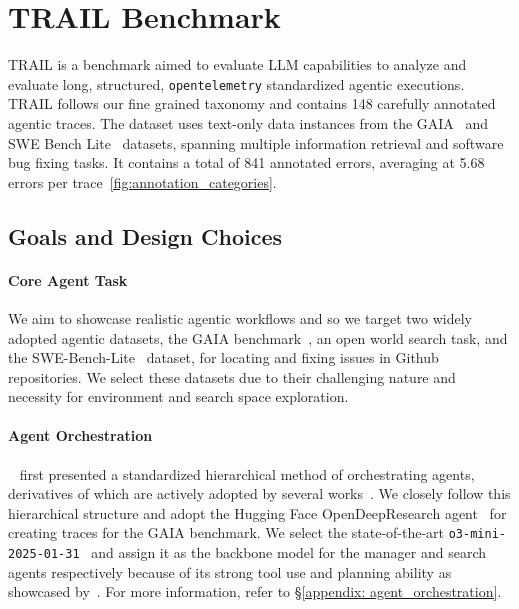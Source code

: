 \documentclass[11pt]{article}
\begin{document}
\section{TRAIL Benchmark}
\textsc{TRAIL} is a benchmark aimed to evaluate LLM capabilities to analyze and evaluate long, structured, \texttt{opentelemetry} standardized agentic executions. 
\textsc{TRAIL} follows our fine grained taxonomy and contains 148 carefully annotated agentic traces. The dataset uses text-only data instances from the GAIA~\cite{mialon2023gaia} and SWE Bench Lite~\cite{jimenez2024swebench} datasets, spanning multiple information retrieval and software bug fixing tasks. It contains a total of 841 annotated errors, averaging at 5.68 errors per trace~\autoref{fig:annotation_categories}.

\subsection{Goals and Design Choices}
\paragraph{Core Agent Task}
We aim to showcase realistic agentic workflows and so we target two widely adopted agentic datasets, the GAIA benchmark~\cite{mialon2023gaia}, an open world search task, and the SWE-Bench-Lite~\cite{jimenez2024swebench} dataset, for locating and fixing issues in Github repositories. We select these datasets due to their challenging nature and necessity for environment and search space exploration.

\paragraph{Agent Orchestration}
~\citet{liu2023bolaa} first presented a standardized hierarchical method of orchestrating agents, derivatives of which are actively adopted by several works~\cite{zhao2024epo, zhao2025cityeqa}. We closely follow this hierarchical structure and adopt the Hugging Face OpenDeepResearch agent~\cite{huggingface2024opendeepresearch} for creating traces for the GAIA benchmark. We select the state-of-the-art \verb|o3-mini-2025-01-31|~\cite{openai_o3mini} and assign it as the backbone model for the manager and search agents respectively because of its strong tool use and planning ability as showcased by~\citet{phan2025humanitysexam}. For more information, refer to \S\ref{appendix: agent_orchestration}.
\end{document}

